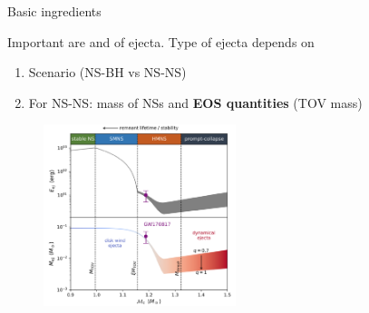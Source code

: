 \documentclass[usenames,dvipsnames,t]{beamer}
\begin{document}
\begin{frame}{Basic ingredients}

  \def\x{3mm}
  \def\y{1mm}

    
    
    
    


  Important are  and  of ejecta. Type of ejecta depends on
  \vspace{\y}
  \begin{enumerate}
    \item Scenario (NS-BH vs NS-NS)
    
    \vspace{\x}
    
    \item For NS-NS: mass of NSs and \textbf{EOS quantities} (TOV mass)
  \end{enumerate}

  \begin{figure}
    \centering
    \includegraphics[width=0.5\textwidth]{Figures/mass_ejecta_vs_Mc_NS_lifetimes.png}
  \end{figure}

\end{frame}
\end{document}
